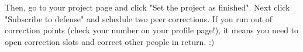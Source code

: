 \documentclass{42-en}
\begin{document}
Then, go to your project page and click "Set the project as finished".
Next click "Subscribe to defense" and schedule two peer corrections.
If you run out of correction points (check your number on your profile page!), it means you need to open correction slots and correct other people in return. :)
\end{document}
